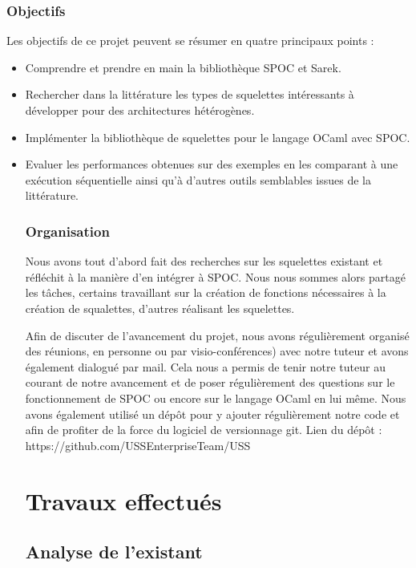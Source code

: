 \documentclass{report}
\begin{document}
\subsection{Objectifs}
Les objectifs de ce projet peuvent se résumer en quatre principaux points :
\begin{itemize}
\item Comprendre et prendre en main la bibliothèque SPOC et Sarek.
\item Rechercher dans la littérature les types de squelettes intéressants à développer  pour des architectures hétérogènes.
\item Implémenter la bibliothèque de squelettes pour le langage OCaml avec SPOC.
\item Evaluer les performances obtenues sur des exemples en les comparant à une exécution séquentielle ainsi qu'à d'autres outils semblables issues de la littérature. 

\subsection{Organisation}
Nous avons tout d'abord fait des recherches sur les squelettes existant et réfléchit à la manière d'en intégrer à SPOC.\newline
Nous nous sommes alors partagé les tâches, certains travaillant sur la création de fonctions nécessaires à la création de squalettes, d'autres réalisant les squelettes.\newline

Afin de discuter de l'avancement du projet, nous avons régulièrement organisé des réunions, en personne ou par visio-conférences) avec notre tuteur et avons également dialogué par mail.\newline
Cela nous a permis de tenir notre tuteur au courant de notre avancement et de poser régulièrement des questions sur le fonctionnement de SPOC ou encore sur le langage OCaml en lui même.\newline
Nous avons également utilisé un dépôt pour y ajouter régulièrement notre code et afin de profiter de la force du logiciel de versionnage git.\newline
Lien du dépôt : https://github.com/USSEnterpriseTeam/USS

\chapter{Travaux effectués}
\section{Analyse de l'existant}

\end{itemize}
\end{document}

